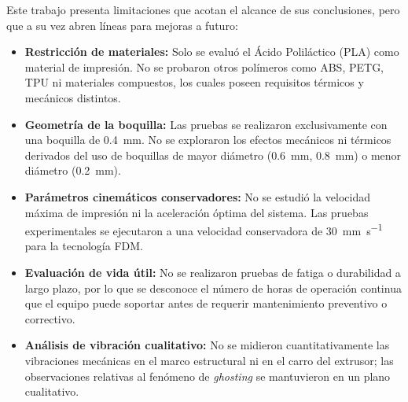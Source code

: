 Este trabajo presenta limitaciones que acotan el alcance de sus conclusiones, pero que a su vez abren líneas para mejoras a futuro:


\begin{itemize}
    \item \textbf{Restricción de materiales:} Solo se evaluó el Ácido Poliláctico (PLA) como material de impresión. No se probaron otros polímeros como ABS, PETG, TPU ni materiales compuestos, los cuales poseen requisitos térmicos y mecánicos distintos.
    
    \item \textbf{Geometría de la boquilla:} Las pruebas se realizaron exclusivamente con una boquilla de \qty{0.4}{\mm}. No se exploraron los efectos mecánicos ni térmicos derivados del uso de boquillas de mayor diámetro (\qty{0.6}{\mm}, \qty{0.8}{\mm}) o menor diámetro (\qty{0.2}{\mm}).
    
    \item \textbf{Parámetros cinemáticos conservadores:} No se estudió la velocidad máxima de impresión ni la aceleración óptima del sistema. Las pruebas experimentales se ejecutaron a una velocidad conservadora de \qty{30}{\mm\per\second} para la tecnología FDM.
    
    \item \textbf{Evaluación de vida útil:} No se realizaron pruebas de fatiga o durabilidad a largo plazo, por lo que se desconoce el número de horas de operación continua que el equipo puede soportar antes de requerir mantenimiento preventivo o correctivo.
    
    \item \textbf{Análisis de vibración cualitativo:} No se midieron cuantitativamente las vibraciones mecánicas en el marco estructural ni en el carro del extrusor; las observaciones relativas al fenómeno de \textit{ghosting} se mantuvieron en un plano cualitativo.
\end{itemize}

